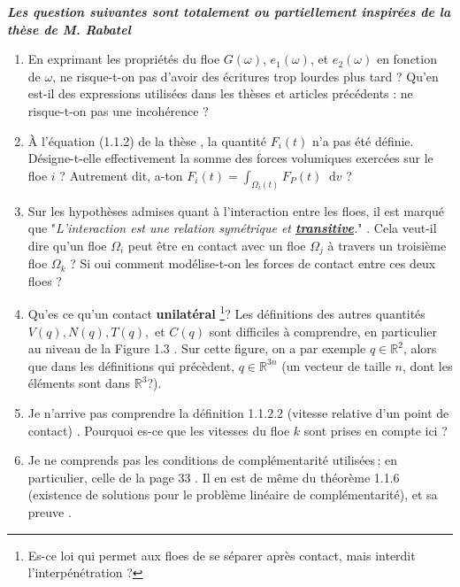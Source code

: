 \documentclass[
  french,
	11pt, %
]{fphw}
\newcommand*\diff{\mathop{}\!\mathrm{d}}
\begin{document}
\textbf{\textit{Les question suivantes sont totalement ou partiellement inspirées de la thèse de M. Rabatel}}

\begin{enumerate}
  \item En exprimant les propriétés du floe $G(\omega)$, $e_1(\omega)$, et $e_2(\omega)$ en fonction de $\omega$, ne risque-t-on pas d'avoir des écritures trop lourdes plus tard ? Qu'en est-il des expressions utilisées dans les thèses et articles précédents : ne risque-t-on pas une incohérence ?

  \item À l'équation (1.1.2) de la thèse \parencite[p.16]{rabatel2015thesis}, la quantité $F_i(t)$ n'a pas été définie. Désigne-t-elle effectivement la somme des forces volumiques exercées sur le floe $i$ ? Autrement dit, a-ton $F_i(t) = \int_{\Omega_i(t)} F_P(t) \diff v$ ?

  \item Sur les hypothèses admises quant à l'interaction entre les floes, il est marqué que "\textit{L’interaction est une relation symétrique et \underline{\textbf{transitive}}.}" \parencite[p.18]{rabatel2015thesis}. Cela veut-il dire qu'un floe $\Omega_i$ peut être en contact avec un floe $\Omega_j$ à travers un troisième floe $\Omega_k$ ? Si oui comment modélise-t-on les forces de contact entre ces deux floes ? 

  \item Qu'es ce qu'un contact \textbf{unilatéral} \parencite[p.20]{rabatel2015thesis} \footnote{Es-ce loi qui permet aux floes de se séparer après contact, mais interdit l’interpénétration \parencite[p.32]{rabatel2015thesis}?}? Les définitions des autres quantités $V(q), N(q), T(q),$ et $C(q)$ sont difficiles à comprendre, en particulier au niveau de la Figure 1.3 \Parencite[P.22]{rabatel2015thesis}. Sur cette figure, on a par exemple $q \in \mathbb{R}^2$, alors que dans les définitions qui précèdent, $q \in \mathbb{R}^{3n}$ (un vecteur de taille $n$, dont les éléments sont dans $\mathbb{R}^3$?).

  \item Je n'arrive pas comprendre la définition 1.1.2.2 (vitesse relative d’un point de contact) \parencite[p.26]{rabatel2015thesis}. Pourquoi es-ce que les vitesses du floe $k$ sont prises en compte ici ?

  \item Je ne comprends pas les conditions de complémentarité utilisées ; en particulier, celle de la page 33 \parencite[p.33]{rabatel2015thesis}. Il en est de même du théorème 1.1.6 (existence de solutions pour le problème linéaire de complémentarité), et sa preuve \parencite[p.36]{rabatel2015thesis}.


\end{enumerate}
\end{document}
